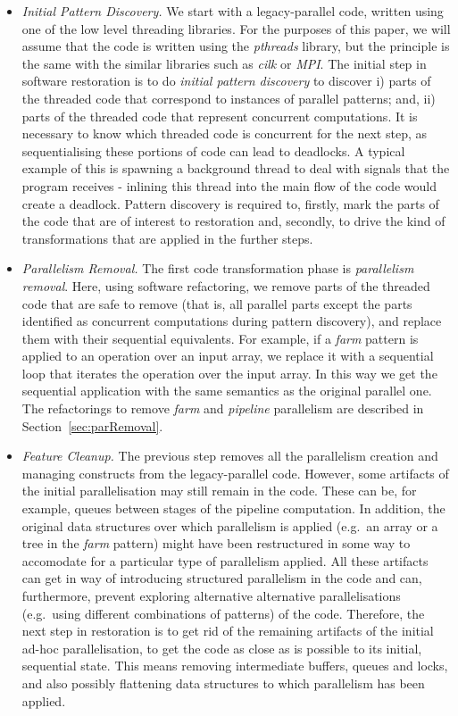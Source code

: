 \documentclass{llncs}
\begin{document}
\begin{itemize}
\item \emph{Initial Pattern Discovery.} We start with a legacy-parallel code, written using one of the low level threading libraries. For the purposes of this paper, we will assume that the code is written using the \emph{pthreads} library, but the principle is the same with the similar libraries such as \emph{cilk} or \emph{MPI}. The initial step in software restoration is to do \emph{initial pattern discovery} to discover i) parts of the threaded code that correspond to instances of parallel patterns; and, ii) parts of the threaded code that represent concurrent computations. It is necessary to know which threaded code is concurrent for the next step, as sequentialising these portions of code can lead to deadlocks. A typical example of this is spawning a background thread to deal with signals that the program receives - inlining this thread into the main flow of the code would create a deadlock. Pattern discovery is required to, firstly, mark the parts of the code that are of interest to restoration and, secondly, to drive the kind of transformations that are applied in the further steps.

\item \emph{Parallelism Removal.} The first code transformation phase is \emph{parallelism removal}. Here, using software refactoring, we remove parts of the threaded code  that are safe to remove (that is, all parallel parts except the parts identified as concurrent computations during pattern discovery), and replace them with their sequential equivalents. For example, if a \emph{farm} pattern is applied to an operation over an input array, we replace it with a sequential loop that iterates the operation over the input array. In this way we get the sequential application with the same semantics as the original parallel one. The refactorings to remove \emph{farm} and \emph{pipeline} parallelism are described in Section~\ref{sec:parRemoval}.

\item \emph{Feature Cleanup.} The previous step removes all the parallelism creation and managing constructs from the legacy-parallel code. However, some artifacts of the initial parallelisation may still remain in the code. These can be, for example, queues between stages of the pipeline computation. In addition, the original data structures over which parallelism is applied (e.g.~an array or a tree in the \emph{farm} pattern) might have been restructured in some way to accomodate for a particular type of parallelism applied. All these artifacts can get in way of introducing structured parallelism in the code and can, furthermore, prevent exploring alternative alternative parallelisations (e.g.~using different combinations of patterns) of the code. Therefore, the next step in restoration is to get rid of the remaining artifacts of the initial ad-hoc parallelisation, to get the code as close as is possible to its initial, sequential state. This means removing intermediate buffers, queues and locks, and also possibly flattening data structures to which parallelism has been applied. 
  

\end{itemize}
\end{document}
